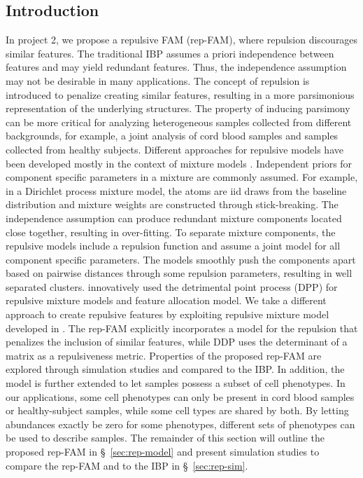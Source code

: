 \documentclass[12pt,]{article}
\begin{document}
\subsection{Introduction}
In project 2, we propose a repulsive FAM (rep-FAM), where repulsion discourages
similar features. The traditional IBP assumes a priori independence between
features and may yield redundant features. Thus, the independence assumption
may not be desirable in many applications.  The concept of repulsion is
introduced to penalize creating similar features, resulting in a more
parsimonious representation of the underlying structures.  The property of
inducing parsimony can be more critical for analyzing heterogeneous samples
collected from different backgrounds, for example, a joint analysis of cord
blood samples and samples collected from healthy subjects.  Different
approaches for repulsive models have been developed mostly in the context of
mixture models \citep{petralia2012repulsive, quinlan2017parsimonious,
xie2017bayesian, quinlan2017density}.  Independent priors for component
specific parameters in a mixture are commonly assumed. For example, in a
Dirichlet process mixture model, the atoms are iid draws from the baseline
distribution and mixture weights are constructed through stick-breaking. The
independence assumption can produce redundant mixture components located close
together, resulting in over-fitting.  To separate mixture components, the
repulsive models include a repulsion function and assume a joint model for all
component specific parameters.  The models smoothly push the components apart
based on pairwise distances through some repulsion parameters, resulting in
well separated clusters.  \cite{xu2016bayesian} innovatively used the
detrimental point process (DPP) for repulsive mixture models and feature
allocation model.  We take a different approach to create repulsive features by
exploiting repulsive mixture model developed in \cite{quinlan2017density}.  The
rep-FAM explicitly incorporates a model for the repulsion that penalizes the
inclusion of similar features, while DDP uses the determinant of a matrix as a
repulsiveness metric. Properties of the proposed rep-FAM are explored through
simulation studies and compared to the IBP. In addition, the model is further
extended to let samples possess a subset of cell phenotypes. In our
applications, some cell phenotypes can only be present in cord blood samples or
healthy-subject samples, while some cell types are shared by both.  By letting
abundances exactly be zero for some phenotypes, different sets of phenotypes
can be used to describe samples.  The remainder of this section will outline
the proposed rep-FAM in \S~\ref{sec:rep-model} and present simulation studies
to compare the rep-FAM and to the IBP in \S~\ref{sec:rep-sim}.
\end{document}
